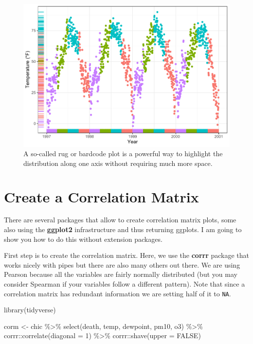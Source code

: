 \documentclass[
]{krantz}
\makeatletter
\newenvironment{Shaded}{\begin{snugshade}}{\end{snugshade}}
\newcommand{\AttributeTok}[1]{\textcolor[rgb]{0.61,0.61,0.61}{#1}}
\newcommand{\ConstantTok}[1]{\textcolor[rgb]{0,0,0}{#1}}
\newcommand{\DecValTok}[1]{\textcolor[rgb]{0.06,0.06,0.06}{#1}}
\newcommand{\FunctionTok}[1]{\textcolor[rgb]{0,0,0}{#1}}
\newcommand{\NormalTok}[1]{#1}
\newcommand{\OtherTok}[1]{\textcolor[rgb]{0.37,0.37,0.37}{#1}}
\newcommand{\SpecialCharTok}[1]{\textcolor[rgb]{0,0,0}{#1}}
\newenvironment{kframe}{%
\medskip{}
\setlength{\fboxsep}{.8em}
 \def\at@end@of@kframe{}%
 \ifinner\ifhmode%
  \def\at@end@of@kframe{\end{minipage}}%
  \begin{minipage}{\columnwidth}%
 \fi\fi%
 \def\FrameCommand##1{\hskip\@totalleftmargin \hskip-\fboxsep
 \colorbox{shadecolor}{##1}\hskip-\fboxsep
     \hskip-\linewidth \hskip-\@totalleftmargin \hskip\columnwidth}%
 \MakeFramed {\advance\hsize-\width
   \@totalleftmargin\z@ \linewidth\hsize
   \@setminipage}}%
 {\par\unskip\endMakeFramed%
 \at@end@of@kframe}
\renewenvironment{Shaded}{\begin{kframe}}{\end{kframe}}
\makeatother
\begin{document}
\begin{figure}
\centering
\includegraphics{bookdown_files/figure-latex/rug-1.pdf}
\caption{\label{fig:rug}A so-called rug or bardcode plot is a powerful way to highlight the distribution along one axis without requiring much more space.}
\end{figure}

\hypertarget{create-a-correlation-matrix}{%
\section{Create a Correlation Matrix}\label{create-a-correlation-matrix}}

There are several packages that allow to create correlation matrix plots, some also using the \textbf{ggplot2} infrastructure and thus returning ggplots. I am going to show you how to do this without extension packages.

First step is to create the correlation matrix. Here, we use the \textbf{corrr} package that works nicely with pipes but there are also many others out there. We are using Pearson because all the variables are fairly normally distributed (but you may consider Spearman if your variables follow a different pattern). Note that since a correlation matrix has redundant information we are setting half of it to \texttt{NA}.

\begin{Shaded}
\begin{Highlighting}[]
\FunctionTok{library}\NormalTok{(tidyverse)}

\NormalTok{corm }\OtherTok{\textless{}{-}}
\NormalTok{  chic }\SpecialCharTok{\%\textgreater{}\%}
  \FunctionTok{select}\NormalTok{(death, temp, dewpoint, pm10, o3) }\SpecialCharTok{\%\textgreater{}\%}
\NormalTok{  corrr}\SpecialCharTok{::}\FunctionTok{correlate}\NormalTok{(}\AttributeTok{diagonal =} \DecValTok{1}\NormalTok{) }\SpecialCharTok{\%\textgreater{}\%}
\NormalTok{  corrr}\SpecialCharTok{::}\FunctionTok{shave}\NormalTok{(}\AttributeTok{upper =} \ConstantTok{FALSE}\NormalTok{)}
\end{Highlighting}
\end{Shaded}
\end{document}
